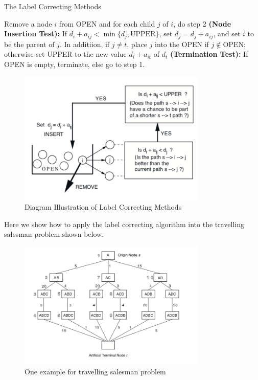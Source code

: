 \begin{algorithm}[htb] 
\caption{The Label Correcting Methods} 
\label{alg:LCM} 
\begin{algorithmic}[1] %
\STATE {}Remove a node $i$ from OPEN and for each child $j$ of $i$, do step 2
\STATE \textbf{(Node Insertion Test): }If $d_{i}+a_{ij}<\min\{d_j,\text{UPPER}\}$, set $d_j = d_j + a_{ij}$, and set $i$ to be the parent of $j$.
In additiion, if $j\ne t$, place $j$ into the OPEN if $j\notin\text{OPEN}$; 
otherwise set UPPER to the new value $d_i+a_{it}$ of $d_t$
\STATE\textbf{(Termination Test): }If OPEN is empty, terminate, else go to step 1. 
\label{code:GA}
\end{algorithmic}
\end{algorithm}
\begin{figure}
\centering
\includegraphics[width=0.8\textwidth]{Forth_lecture/p_2}
\caption{Diagram Illustration of Label Correcting Methods}
\end{figure}
Here we show how to apply the label correcting algorithm into the travelling salesman problem shown below.
\begin{figure}
\centering
\includegraphics[width=0.8\textwidth]{Forth_lecture/p_5}
\caption{One example for travelling salesman problem}
\end{figure}
